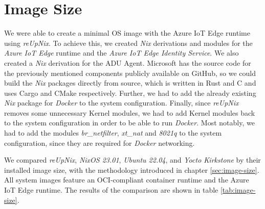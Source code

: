 
\section{Image Size}
We were able to create a minimal \ac{OS} image with the Azure IoT Edge runtime
using \textit{reUpNix}. To achieve this, we created \textit{Nix} derivations
and modules for the \textit{Azure IoT Edge} runtime and the \textit{Azure IoT Edge
Identity Service}. We also created a \textit{Nix} derivation for the \ac{ADU} Agent.
Microsoft has the source code for the previously mentioned components
publicly available on GitHub, so we could build the \textit{Nix} packages directly
from source, which is written in Rust and C and uses Cargo and CMake respectively.
Further, we had to add the already existing \textit{Nix} package for \textit{Docker}
to the system configuration. Finally, since \textit{reUpNix} removes some unnecessary
Kernel modules, we had to add Kernel modules back to the system configuration in order
to be able to run \textit{Docker}. Most notably, we had to add the modules
\textit{br\_netfilter}, \textit{xt\_nat} and \textit{8021q} to the system configuration,
since they are required for \textit{Docker} networking.

We compared \textit{reUpNix}, \textit{NixOS 23.01}, \textit{Ubuntu 22.04}, and
\textit{Yocto Kirkstone} by their installed image size, with the methodology introduced
in chapter \ref{sec:image-size}. All system images feature an \ac{OCI}-compliant container runtime
and the Azure IoT Edge runtime. The results of the comparison are shown in table \ref{tab:image-size}.

